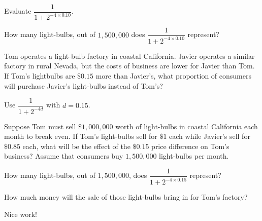 \documentclass{ximera}
\begin{document}
\begin{question}
 \begin{multipleChoice}
    \end{multipleChoice}
\begin{hint}
Evaluate $\dfrac{1}{1+2^{-4\times 0.10}}$.
\end{hint}
\begin{hint}
How many light-bulbs, out of $1,500,000$ does $\dfrac{1}{1+2^{-4\times 0.10}}$ represent?
\end{hint}

\end{question}

\begin{question}

Tom operates a light-bulb factory in coastal California. Javier operates a similar factory in rural Nevada, but the costs of business are lower for Javier than Tom. If Tom's lightbulbs are $\$0.15$ more than Javier's, what proportion of consumers will purchase Javier's light-bulbs instead of Tom's?

\begin{multipleChoice}
\end{multipleChoice}
\begin{hint}
Use $\dfrac{1}{1+2^{-4d}}$ with $d=0.15$.
\end{hint}

\end{question}


\begin{question}
Suppose Tom must sell $\$1,000,000$ worth of light-bulbs in coastal California each month to break even. If Tom's light-bulbs sell for $\$1$ each while Javier's sell for $\$0.85$ each, what will be the effect of the $\$0.15$ price difference on Tom's business? Assume that consumers buy $1,500,000$ light-bulbs per month. 


\begin{multipleChoice}
    \end{multipleChoice}
\begin{hint}
How many light-bulbs, out of $1,500,000$, does $\dfrac{1}{1+2^{-4\times 0.15}}$ represent?
\end{hint}
\begin{hint}
How much money will the sale of those light-bulbs bring in for Tom's factory?
\end{hint}

Nice work!
\end{question}
\end{document}
